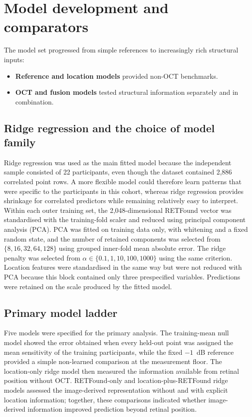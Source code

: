 \section{Model development and comparators}
\label{sec:models}

The model set progressed from simple references to increasingly rich structural inputs:

\begin{itemize}[nosep]
  \item \textbf{Reference and location models} provided non-OCT benchmarks.
  \item \textbf{OCT and fusion models} tested structural information separately and in combination.
\end{itemize}

\subsection{Ridge regression and the choice of model family}

Ridge regression was used as the main fitted model because the independent sample consisted of 22 participants, even though the dataset contained 2,886 correlated point rows. A more flexible model could therefore learn patterns that were specific to the participants in this cohort, whereas ridge regression provides shrinkage for correlated predictors while remaining relatively easy to interpret. Within each outer training set, the 2,048-dimensional RETFound vector was standardised with the training-fold scaler and reduced using principal component analysis (PCA). PCA was fitted on training data only, with whitening and a fixed random state, and the number of retained components was selected from $\{8, 16, 32, 64, 128\}$ using grouped inner-fold mean absolute error. The ridge penalty was selected from $\alpha \in \{0.1, 1, 10, 100, 1000\}$ using the same criterion. Location features were standardised in the same way but were not reduced with PCA because this block contained only three prespecified variables. Predictions were retained on the scale produced by the fitted model.

\subsection{Primary model ladder}

Five models were specified for the primary analysis. The training-mean null model showed the error obtained when every held-out point was assigned the mean sensitivity of the training participants, while the fixed $-1$~dB reference provided a simple non-learned comparison at the measurement floor. The location-only ridge model then measured the information available from retinal position without OCT. RETFound-only and location-plus-RETFound ridge models assessed the image-derived representation without and with explicit location information; together, these comparisons indicated whether image-derived information improved prediction beyond retinal position.

